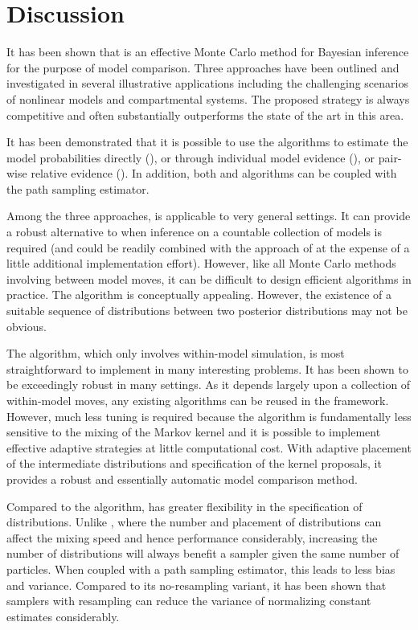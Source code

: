 \section{Discussion}
\label{sec:Bayesian SMC discussion}

It has been shown that \smc is an effective Monte Carlo method for Bayesian
inference for the purpose of model comparison. Three approaches have been
outlined and investigated in several illustrative applications including the
challenging scenarios of nonlinear \ode models and \pet compartmental systems.
The proposed strategy is always competitive and often substantially
outperforms the state of the art in this area.

It has been demonstrated that it is possible to use the \smc algorithms to
estimate the model probabilities directly (\smc[1]), or through individual
model evidence (\smc[2]), or pair-wise relative evidence (\smc[3]). In
addition, both \smc[2] and \smc[3] algorithms can be coupled with the path
sampling estimator.

Among the three approaches, \smc[1] is applicable to very general settings. It
can provide a robust alternative to \rjmcmc when inference on a countable
collection of models is required (and could be readily combined with the
approach of \cite{Jasra:2008bb} at the expense of a little additional
implementation effort). However, like all Monte Carlo methods involving
between model moves, it can be difficult to design efficient algorithms in
practice. The \smc[3] algorithm is conceptually appealing. However, the
existence of a suitable sequence of distributions between two posterior
distributions may not be obvious.

The \smc[2] algorithm, which only involves within-model simulation, is most
straightforward to implement in many interesting problems. It has been shown
to be exceedingly robust in many settings. As it depends largely upon a
collection of within-model \mcmc moves, any existing \mcmc algorithms can be
reused in the \smc[2] framework. However, much less tuning is required because
the algorithm is fundamentally less sensitive to the mixing of the Markov
kernel and it is possible to implement effective adaptive strategies at little
computational cost. With adaptive placement of the intermediate distributions
and specification of the \mcmc kernel proposals, it provides a robust and
essentially automatic model comparison method.

Compared to the \pmcmc algorithm, \smc[2] has greater flexibility in the
specification of distributions. Unlike \pmcmc, where the number and placement
of distributions can affect the mixing speed and hence performance
considerably, increasing the number of distributions will always benefit a
\smc sampler given the same number of particles. When coupled with a path
sampling estimator, this leads to less bias and variance. Compared to its
no-resampling variant, it has been shown that \smc samplers with resampling
can reduce the variance of normalizing constant estimates considerably.

